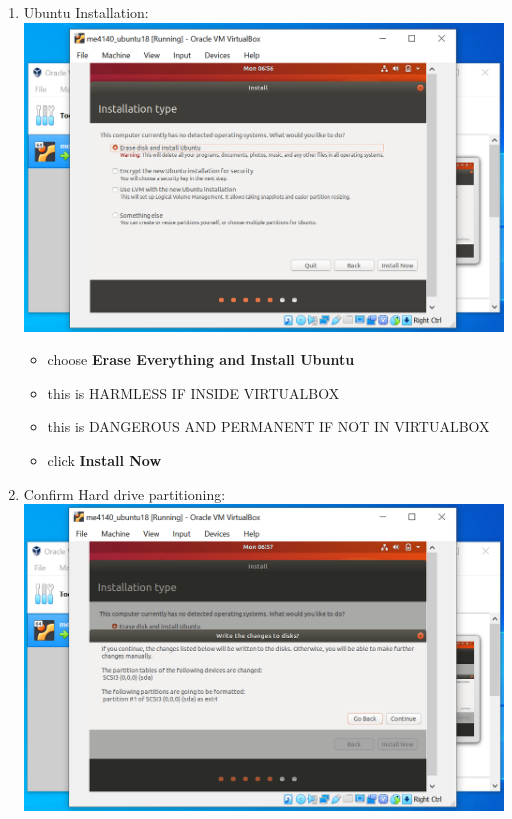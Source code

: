 \documentclass[12pt]{article}
\begin{document}
\begin{description}
\begin{description}
\begin{enumerate}[label=\alph*)]
\vspace{5mm} 
\newpage
\item Ubuntu Installation: \vspace{5mm} \\
      		\hspace*{-2.5cm}\includegraphics[scale=.6]{Capture16.png}\\
             \begin{itemize}
                    
                 \item choose {\bf Erase Everything and Install Ubuntu} 
                 \item this is {\B HARMLESS IF INSIDE VIRTUALBOX}
                 \item this is {\R DANGEROUS AND PERMANENT IF NOT IN VIRTUALBOX}
                 \item click {\bf Install Now}

            \end{itemize}

\vspace{5mm} 
\item Confirm Hard drive partitioning: \vspace{5mm} \\
      		\hspace*{-2.5cm}\includegraphics[scale=.6]{Capture17.png}
      		 \begin{itemize}
                    

\end{itemize}
\end{enumerate}
\end{description}
\end{description}
\end{document}
